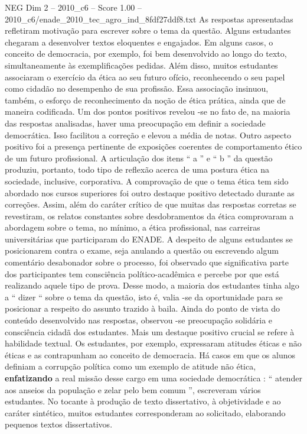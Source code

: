 \begin{textsample}{NEG Dim 2 – 2010\_c6 – Score 1.00 – 2010\_c6/enade\_2010\_tec\_agro\_ind\_8fdf27ddf8.txt}
As respostas apresentadas refletiram motivação para escrever sobre o tema da questão.
Alguns estudantes chegaram a desenvolver textos eloquentes e engajados.
Em alguns casos, o conceito de democracia, por exemplo, foi bem desenvolvido ao longo do texto, simultaneamente às exemplificações pedidas.
Além disso, muitos estudantes associaram o exercício da ética ao seu futuro ofício, reconhecendo o seu papel como cidadão no desempenho de sua profissão.
Essa associação insinuou, também, o esforço de reconhecimento da noção de ética prática, ainda que de maneira codificada.
Um dos pontos positivos revelou -se no fato de, na maioria das respostas analisadas, haver uma preocupação em definir a sociedade democrática.
Isso facilitou a correção e elevou a média de notas.
Outro aspecto positivo foi a presença pertinente de exposições coerentes de comportamento ético de um futuro profissional.
A articulação dos itens “ a ” e “ b ” da questão produziu, portanto, todo tipo de reflexão acerca de uma postura ética na sociedade, inclusive, corporativa.
A comprovação de que o tema ética tem sido abordado nos cursos superiores foi outro destaque positivo detectado durante as correções.
Assim, além do caráter crítico de que muitas das respostas corretas se revestiram, os relatos constantes sobre desdobramentos da ética comprovaram a abordagem sobre o tema, no mínimo, a ética profissional, nas carreiras universitárias que participaram do ENADE.
A despeito de alguns estudantes se posicionarem contra o exame, seja anulando a questão ou escrevendo algum comentário desabonador sobre o processo, foi observado que significativa parte dos participantes tem consciência político-acadêmica e percebe por que está realizando aquele tipo de prova.
Desse modo, a maioria dos estudantes tinha algo a “ dizer “ sobre o tema da questão, isto é, valia -se da oportunidade para se posicionar a respeito do assunto trazido à baila.
Ainda do ponto de vista do conteúdo desenvolvido nas respostas, observou -se preocupação solidária e consciência cidadã dos estudantes.
Mais um destaque positivo crucial se refere à habilidade textual.
Os estudantes, por exemplo, expressaram atitudes éticas e não éticas e as contrapunham ao conceito de democracia.
Há casos em que os alunos definiam a corrupção política como um exemplo de atitude não ética, \textbf{enfatizando} a real missão desse cargo em uma sociedade democrática : “ atender aos anseios da população e zelar pelo bem comum ”, escreveram vários estudantes.
No tocante à produção de texto dissertativo, à objetividade e ao caráter sintético, muitos estudantes corresponderam ao solicitado, elaborando pequenos textos dissertativos.

\end{textsample}

